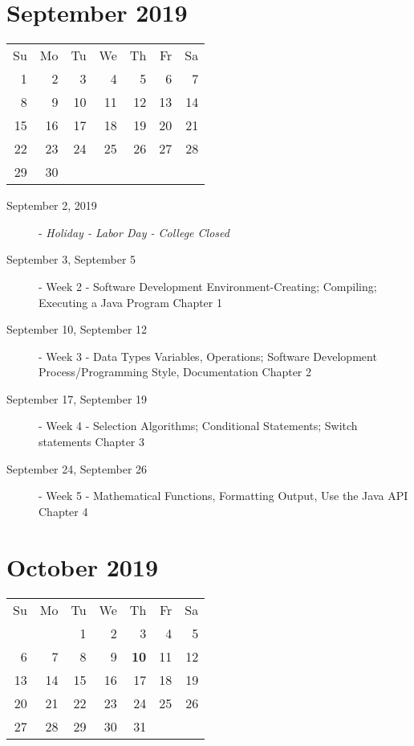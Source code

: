 \documentclass{article}
\begin{document}
\hrulefill

\section*{September 2019}
\begin{tabular}{rrrrrrr}
Su & Mo & Tu & We & Th & Fr & Sa\\
 1 &  2 &  3 &  4 &  5 &  6 & 7\\
 8 &  9 & 10 & 11 & 12 & 13 & 14\\
15 & 16 & 17 & 18 & 19 & 20 & 21\\
22 & 23 & 24 & 25 & 26 & 27 & 28\\
29 & 30 &    &    &    &    &   \\
\end{tabular}

\begin{description}
    \item[September 2, 2019] - {\em Holiday - Labor Day - College Closed}
    \item[September 3, September 5] - Week 2 - Software Development
        Environment-Creating; Compiling; Executing a Java Program
        \newline Chapter 1
    \item[September 10, September 12] - Week 3 - Data Types Variables,
        Operations; Software Development Process/Programming Style,
        Documentation
        \newline Chapter 2
    \item[September 17, September 19] - Week 4 - Selection Algorithms;
        Conditional Statements; Switch statements
        \newline Chapter 3
    \item[September 24, September 26] - Week 5 - Mathematical
        Functions, Formatting Output, Use the Java API
        \newline Chapter 4
\end{description}

\hrulefill

\section*{October 2019}
\begin{tabular}{rrrrrrr}
Su & Mo & Tu & We & Th & Fr & Sa\\
   &    &  1 &  2 &  3 &  4 &  5\\
 6 &  7 &  8 &  9 & {\bf 10} & 11 & 12\\
13 & 14 & 15 & 16 & 17 & 18 & 19\\ 
20 & 21 & 22 & 23 & 24 & 25 & 26\\ 
27 & 28 & 29 & 30 & 31 &    &   \\
\end{tabular}
\end{document}
